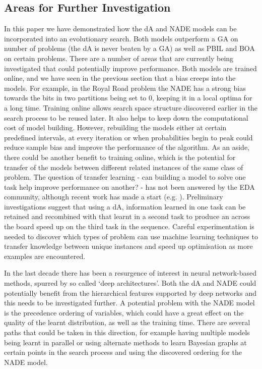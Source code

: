 \documentclass[twoside]{article}
\begin{document}
\subsection{Areas for Further Investigation}
In this paper we have demonstrated how the dA and NADE models can be incorporated into an evolutionary search. Both models outperform a GA on number of problems (the dA is never beaten by a GA) as well as PBIL and BOA on certain problems. There are a number of areas that are currently being investigated that could potentially improve performance. Both models are trained online, and we have seen in the previous section that a bias creeps into the models. For example, in the Royal Road problem the NADE has a strong bias towards the bits in two partitions being set to 0, keeping it in a local optima for a long time. Training online allows search space structure discovered earlier in the search process to be reused later. It also helps to keep down the computational cost of model building. However, rebuilding the models either at certain predefined intervals, at every iteration or when probabilities begin to peak could reduce sample bias and improve the performance of the algorithm. As an aside, there could be another benefit to training online, which is the potential for transfer of the models between different related instances of the same class of problem. The question of transfer learning - can building a model to solve one task help improve performance on another? - has not been answered by the EDA community, although recent work has made a start (e.g. \cite{hauschild2012using}). Preliminary investigations suggest that using a dA, information learned in one task can be retained and recombined with that learnt in a second task to produce an across the board speed up on the third task in the sequence. Careful experimentation is needed to discover which types of problem can use machine learning techniques to transfer knowledge between unique instances and speed up optimisation as more examples are encountered.

In the last decade there has been a resurgence of interest in neural network-based methods, spurred by so called `deep architectures'. Both the dA and NADE could potentially benefit from the hierarchical features supported by deep networks and this needs to be investigated further. A potential problem with the NADE model is the precedence ordering of variables, which could have a great effect on the quality of the learnt distribution, as well as the training time. There are several paths that could be taken in this direction, for example having multiple models being learnt in parallel or using alternate methods to learn Bayesian graphs at certain points in the search process and using the discovered ordering for the NADE model.
\end{document}
